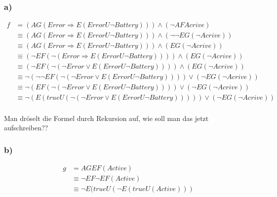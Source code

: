 \subsubsection*{a)}
\begin{align*}
f&= \left(AG(Error \Rightarrow E(Error U \neg Battery))\right) \wedge \left( \neg AF Acrive\right)\\
&\equiv \left(AG(Error \Rightarrow E(Error U \neg Battery))\right) \wedge \left( \neg \neg EG( \neg Acrive)\right)\\
&\equiv \left(AG(Error \Rightarrow E(Error U \neg Battery))\right) \wedge \left( EG( \neg Acrive)\right)\\
&\equiv \left(\neg EF (\neg(Error \Rightarrow E(Error U \neg Battery)))\right) \wedge \left( EG( \neg Acrive)\right)\\
&\equiv \left(\neg EF (\neg(\neg Error \vee E(Error U \neg Battery)))\right) \wedge \left( EG( \neg Acrive)\right)\\
&\equiv \neg\left(\neg \neg EF (\neg(\neg Error \vee E(Error U \neg Battery)))\right) \vee \left(\neg EG( \neg Acrive)\right)\\
&\equiv \neg\left(EF (\neg(\neg Error \vee E(Error U \neg Battery)))\right) \vee \left(\neg EG( \neg Acrive)\right)\\
&\equiv \neg\left(E (trueU (\neg(\neg Error \vee E(Error U \neg Battery))))\right) \vee \left(\neg EG( \neg Acrive)\right)\\
\end{align*}

Man dröselt die Formel durch Rekursion auf, wie soll man das jetzt aufschreiben??

\subsubsection*{b)}
\begin{align*}
g&=	AGEF(Active)\\
&\equiv\neg EF \neg EF (Active)\\
&\equiv\neg E(true U (\neg E(trueU (Active)))\\
\end{align*}



